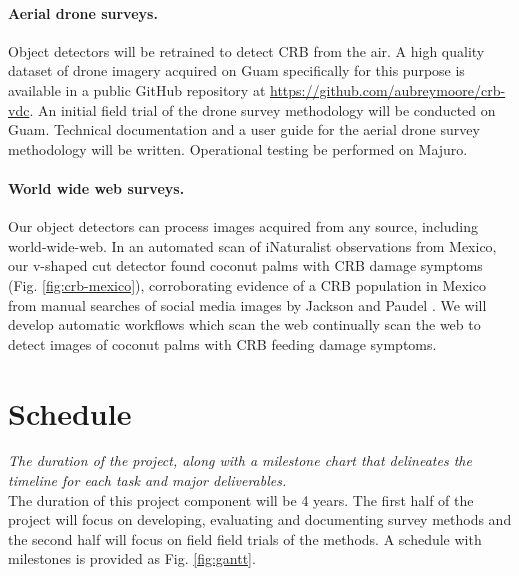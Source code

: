 \documentclass[11pt,english,letterpaper]{scrartcl}
\begin{document}
\paragraph{Aerial drone surveys.} Object detectors will be retrained to detect CRB from the air. A high quality dataset of drone imagery acquired on Guam specifically for this purpose is available in a public GitHub repository at \url{https://github.com/aubreymoore/crb-vdc}. An initial field trial of the drone survey methodology will be conducted on Guam. Technical documentation and a user guide for the aerial drone survey methodology will be written. Operational testing be performed on Majuro.

\paragraph{World wide web surveys.}

Our object detectors can process images acquired from any source, including world-wide-web. In an automated scan of iNaturalist observations from Mexico, our v-shaped cut detector found coconut palms with CRB damage symptoms (Fig. \ref{fig:crb-mexico}), corroborating evidence of a CRB population in Mexico from manual searches of social media images by Jackson and Paudel \cite{Jackson2022}. We will develop automatic workflows which scan the web continually scan the web to detect images of coconut palms with CRB feeding damage symptoms.

\clearpage
\section{Schedule}

\textit{The duration of the project, along with a milestone chart that delineates the timeline for each task and major deliverables.} \\

The duration of this project component will be 4 years. The first half of the project will focus on developing, evaluating and documenting survey methods and the second half will focus on field field trials of the methods. A schedule with milestones is provided as Fig. \ref{fig:gantt}.
\end{document}
